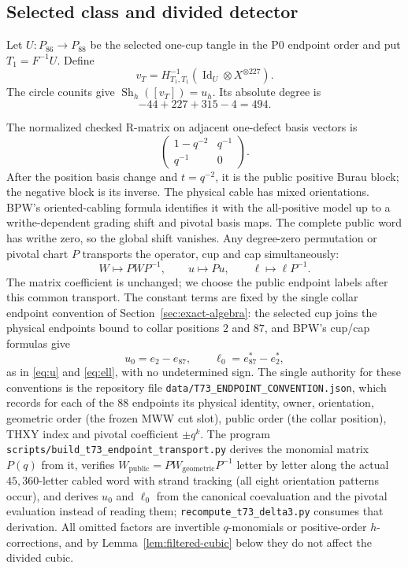 \subsection{Selected class and divided detector}

Let $U:P_{86}\to P_{88}$ be the selected one-cup tangle in the P0 endpoint
order and put $T_1=F^{-1}U$.  Define
\[
v_T=H_{T_1,T_1}^{-1}
  (\operatorname{Id}_U\otimes X^{\otimes227}).
\]
The circle counits give
$\operatorname{Sh}_h([v_T])=u_h$.  Its absolute degree is
\[
-44+227+315-4=494.
\]

The normalized checked R-matrix on adjacent one-defect basis vectors is
\[
\begin{pmatrix}1-q^{-2}&q^{-1}\\q^{-1}&0\end{pmatrix}.
\]
After the position basis change and $t=q^{-2}$, it is the public positive
Burau block; the negative block is its inverse.  The physical cable has mixed
orientations.  BPW's oriented-cabling formula identifies it with the
all-positive model up to a writhe-dependent grading shift and pivotal basis
maps.  The complete public word has writhe zero, so the global shift
vanishes.  Any degree-zero permutation or pivotal chart $P$ transports the
operator, cup and cap simultaneously:
\[
W\mapsto PWP^{-1},\qquad u\mapsto Pu,\qquad
\ell\mapsto\ell P^{-1}.
\]
The matrix coefficient is unchanged; we choose the public endpoint labels
after this common transport.  The constant terms are fixed by the single
collar endpoint convention of Section~\ref{sec:exact-algebra}: the selected
cup joins the physical endpoints bound to collar positions $2$ and $87$, and
BPW's cup/cap formulas give
\[
u_0=e_2-e_{87},\qquad
\ell_0=e_{87}^*-e_2^*,
\]
as in \eqref{eq:u} and \eqref{eq:ell}, with no undetermined sign.  The
single authority for these conventions is the repository file
\texttt{data/T73\_ENDPOINT\_CONVENTION.json}, which records for each of the
$88$ endpoints its physical identity, owner, orientation, geometric order
(the frozen MWW cut slot), public order (the collar position), THXY index
and pivotal coefficient $\pm q^k$.  The program
\texttt{scripts/build\_t73\_endpoint\_transport.py} derives the monomial
matrix $P(q)$ from it, verifies
$W_{\mathrm{public}}=PW_{\mathrm{geometric}}P^{-1}$ letter by letter along
the actual $45{,}360$-letter cabled word with strand tracking (all eight
orientation patterns occur), and derives $u_0$ and $\ell_0$ from the
canonical coevaluation and the pivotal evaluation instead of reading them;
\texttt{recompute\_t73\_delta3.py} consumes that derivation.  All
omitted factors are invertible $q$-monomials or positive-order
$h$-corrections, and by Lemma~\ref{lem:filtered-cubic} below they do not
affect the divided cubic.

